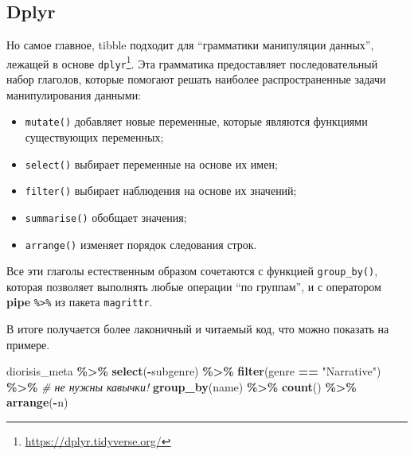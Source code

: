 \documentclass[
]{book}
\newenvironment{Shaded}{\begin{snugshade}}{\end{snugshade}}
\newcommand{\CommentTok}[1]{\textcolor[rgb]{0.56,0.35,0.01}{\textit{#1}}}
\newcommand{\FunctionTok}[1]{\textcolor[rgb]{0.13,0.29,0.53}{\textbf{#1}}}
\newcommand{\NormalTok}[1]{#1}
\newcommand{\SpecialCharTok}[1]{\textcolor[rgb]{0.81,0.36,0.00}{\textbf{#1}}}
\newcommand{\StringTok}[1]{\textcolor[rgb]{0.31,0.60,0.02}{#1}}
\providecommand{\tightlist}{%
  \setlength{\itemsep}{0pt}\setlength{\parskip}{0pt}}
\theoremstyle{definition}
\theoremstyle{definition}
\theoremstyle{definition}
\theoremstyle{definition}
\theoremstyle{remark}
\begin{document}
\hypertarget{dplyr}{%
\subsection{Dplyr}\label{dplyr}}

Но самое главное, tibble подходит для ``грамматики манипуляции данных'', лежащей в основе \texttt{dplyr}\footnote{\url{https://dplyr.tidyverse.org/}}. Эта грамматика предоставляет последовательный набор глаголов, которые помогают решать наиболее распространенные задачи манипулирования данными:

\begin{itemize}
\tightlist
\item
  \texttt{mutate()} добавляет новые переменные, которые являются функциями существующих переменных;
\item
  \texttt{select()} выбирает переменные на основе их имен;
\item
  \texttt{filter()} выбирает наблюдения на основе их значений;
\item
  \texttt{summarise()} обобщает значения;
\item
  \texttt{arrange()} изменяет порядок следования строк.
\end{itemize}

Все эти глаголы естественным образом сочетаются с функцией \texttt{group\_by()}, которая позволяет выполнять любые операции ``по группам'', и с оператором \textbf{pipe} \texttt{\%\textgreater{}\%} из пакета \texttt{magrittr}.

В итоге получается более лаконичный и читаемый код, что можно показать на примере.

\begin{Shaded}
\begin{Highlighting}[]
\NormalTok{diorisis\_meta }\SpecialCharTok{\%\textgreater{}\%} 
  \FunctionTok{select}\NormalTok{(}\SpecialCharTok{{-}}\NormalTok{subgenre) }\SpecialCharTok{\%\textgreater{}\%} 
  \FunctionTok{filter}\NormalTok{(genre }\SpecialCharTok{==} \StringTok{"Narrative"}\NormalTok{) }\SpecialCharTok{\%\textgreater{}\%}  \CommentTok{\# не нужны кавычки!}
  \FunctionTok{group\_by}\NormalTok{(name) }\SpecialCharTok{\%\textgreater{}\%} 
  \FunctionTok{count}\NormalTok{() }\SpecialCharTok{\%\textgreater{}\%} 
  \FunctionTok{arrange}\NormalTok{(}\SpecialCharTok{{-}}\NormalTok{n)}
\end{Highlighting}
\end{Shaded}
\end{document}

